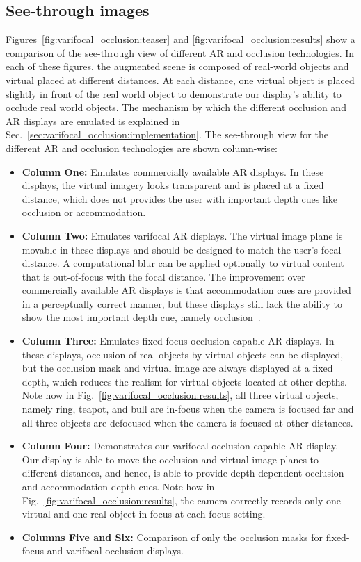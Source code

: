 
\subsection{See-through images}
\label{sec:results_images}
Figures~\ref{fig:varifocal_occlusion:teaser} and \ref{fig:varifocal_occlusion:results} show a comparison of the see-through view of different AR and occlusion technologies. In each of these figures, the augmented scene is composed of real-world objects and virtual placed at different distances. At each distance, one virtual object is placed slightly in front of the real world object to demonstrate our display's ability to occlude real world objects. The mechanism by which the different occlusion and AR displays are emulated is explained in Sec.~\ref{sec:varifocal_occlusion:implementation}. The see-through view for the different AR and occlusion technologies are shown column-wise:
\begin{itemize}
    \item \textbf{Column One:} Emulates commercially available AR displays. In these displays, the virtual imagery looks transparent and is placed at a fixed distance, which does not provides the user with important depth cues like occlusion or accommodation. 
    \item \textbf{Column Two:} Emulates varifocal AR displays. The virtual image plane is movable in these displays and should be designed to match the user's focal distance. A computational blur can be applied optionally to virtual content that is out-of-focus with the focal distance. The improvement over commercially available AR displays is that accommodation cues are provided in a perceptually correct manner, but these displays still lack the ability to show the most important depth cue, namely occlusion~\cite{Cutting:1995}.
    \item \textbf{Column Three:} Emulates fixed-focus occlusion-capable AR displays. In these displays, occlusion of real objects by virtual objects can be displayed, but the occlusion mask and virtual image are always displayed at a fixed depth, which reduces the realism for virtual objects located at other depths. Note how in Fig.~\ref{fig:varifocal_occlusion:results}, all three virtual objects, namely ring, teapot, and bull are in-focus when the camera is focused far and all three objects are defocused when the camera is focused at other distances.
    \item \textbf{Column Four:} Demonstrates our varifocal occlusion-capable AR display. Our display is able to move the occlusion and virtual image planes to different distances, and hence, is able to provide depth-dependent occlusion and accommodation depth cues. Note how in Fig.~\ref{fig:varifocal_occlusion:results}, the camera correctly records only one virtual and one real object in-focus at each focus setting.
    \item \textbf{Columns Five and Six:} Comparison of only the occlusion masks for fixed-focus and varifocal occlusion displays.
\end{itemize}

